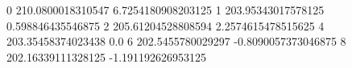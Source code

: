 0 210.0800018310547 6.7254180908203125
1 203.95343017578125 0.598846435546875
2 205.61204528808594 2.2574615478515625
4 203.35458374023438 0.0
6 202.5455780029297 -0.8090057373046875
8 202.16339111328125 -1.191192626953125
